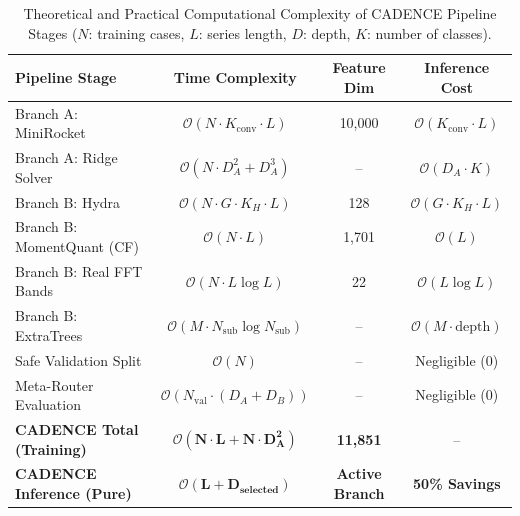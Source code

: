 \begin{table}[t]
\centering
\caption{Theoretical and Practical Computational Complexity of CADENCE Pipeline Stages ($N$: training cases, $L$: series length, $D$: depth, $K$: number of classes).}
\label{tab:complexity}
\small
\begin{tabular}{lccc}
\toprule
\textbf{Pipeline Stage} & \textbf{Time Complexity} & \textbf{Feature Dim} & \textbf{Inference Cost} \\
\midrule
Branch A: MiniRocket & $\mathcal{O}(N \cdot K_{\text{conv}} \cdot L)$ & 10,000 & $\mathcal{O}(K_{\text{conv}} \cdot L)$ \\
Branch A: Ridge Solver & $\mathcal{O}(N \cdot D_A^2 + D_A^3)$ & -- & $\mathcal{O}(D_A \cdot K)$ \\
\midrule
Branch B: Hydra & $\mathcal{O}(N \cdot G \cdot K_H \cdot L)$ & 128 & $\mathcal{O}(G \cdot K_H \cdot L)$ \\
Branch B: MomentQuant (CF) & $\mathcal{O}(N \cdot L)$ & 1,701 & $\mathcal{O}(L)$ \\
Branch B: Real FFT Bands & $\mathcal{O}(N \cdot L \log L)$ & 22 & $\mathcal{O}(L \log L)$ \\
Branch B: ExtraTrees & $\mathcal{O}(M \cdot N_{\text{sub}} \log N_{\text{sub}})$ & -- & $\mathcal{O}(M \cdot \text{depth})$ \\
\midrule
Safe Validation Split & $\mathcal{O}(N)$ & -- & Negligible (0) \\
Meta-Router Evaluation & $\mathcal{O}(N_{\text{val}} \cdot (D_A + D_B))$ & -- & Negligible (0) \\
\midrule
\textbf{CADENCE Total (Training)} & $\mathbf{\mathcal{O}(N \cdot L + N \cdot D_A^2)}$ & \textbf{11,851} & -- \\
\textbf{CADENCE Inference (Pure)} & $\mathbf{\mathcal{O}(L + D_{\text{selected}})}$ & \textbf{Active Branch} & \textbf{50\% Savings} \\
\bottomrule
\end{tabular}
\end{table}
